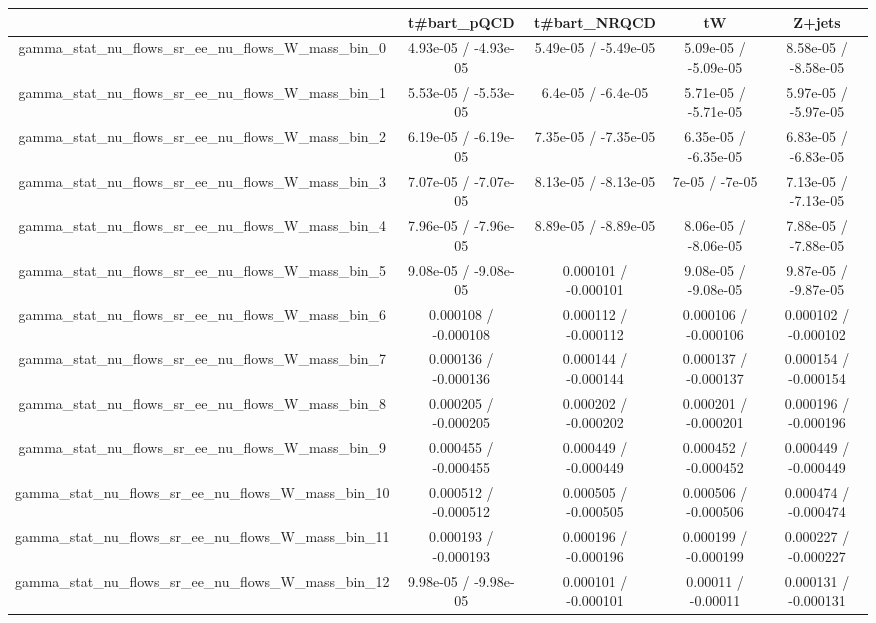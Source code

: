 \documentclass[10pt]{article}
\begin{document}
\begin{table}[htbp]
\begin{center}
\begin{tabular}{|c|c|c|c|c|}
\hline 
      & t#bar{t}_{pQCD}      & t#bar{t}_{NRQCD}      & tW      & Z+jets \\ 
\hline 
  gamma_stat_nu_flows_sr_ee_nu_flows_W_mass_bin_0 & 4.93e-05 / -4.93e-05 & 5.49e-05 / -5.49e-05 & 5.09e-05 / -5.09e-05 & 8.58e-05 / -8.58e-05 \\ 
  gamma_stat_nu_flows_sr_ee_nu_flows_W_mass_bin_1 & 5.53e-05 / -5.53e-05 & 6.4e-05 / -6.4e-05 & 5.71e-05 / -5.71e-05 & 5.97e-05 / -5.97e-05 \\ 
  gamma_stat_nu_flows_sr_ee_nu_flows_W_mass_bin_2 & 6.19e-05 / -6.19e-05 & 7.35e-05 / -7.35e-05 & 6.35e-05 / -6.35e-05 & 6.83e-05 / -6.83e-05 \\ 
  gamma_stat_nu_flows_sr_ee_nu_flows_W_mass_bin_3 & 7.07e-05 / -7.07e-05 & 8.13e-05 / -8.13e-05 & 7e-05 / -7e-05 & 7.13e-05 / -7.13e-05 \\ 
  gamma_stat_nu_flows_sr_ee_nu_flows_W_mass_bin_4 & 7.96e-05 / -7.96e-05 & 8.89e-05 / -8.89e-05 & 8.06e-05 / -8.06e-05 & 7.88e-05 / -7.88e-05 \\ 
  gamma_stat_nu_flows_sr_ee_nu_flows_W_mass_bin_5 & 9.08e-05 / -9.08e-05 & 0.000101 / -0.000101 & 9.08e-05 / -9.08e-05 & 9.87e-05 / -9.87e-05 \\ 
  gamma_stat_nu_flows_sr_ee_nu_flows_W_mass_bin_6 & 0.000108 / -0.000108 & 0.000112 / -0.000112 & 0.000106 / -0.000106 & 0.000102 / -0.000102 \\ 
  gamma_stat_nu_flows_sr_ee_nu_flows_W_mass_bin_7 & 0.000136 / -0.000136 & 0.000144 / -0.000144 & 0.000137 / -0.000137 & 0.000154 / -0.000154 \\ 
  gamma_stat_nu_flows_sr_ee_nu_flows_W_mass_bin_8 & 0.000205 / -0.000205 & 0.000202 / -0.000202 & 0.000201 / -0.000201 & 0.000196 / -0.000196 \\ 
  gamma_stat_nu_flows_sr_ee_nu_flows_W_mass_bin_9 & 0.000455 / -0.000455 & 0.000449 / -0.000449 & 0.000452 / -0.000452 & 0.000449 / -0.000449 \\ 
  gamma_stat_nu_flows_sr_ee_nu_flows_W_mass_bin_10 & 0.000512 / -0.000512 & 0.000505 / -0.000505 & 0.000506 / -0.000506 & 0.000474 / -0.000474 \\ 
  gamma_stat_nu_flows_sr_ee_nu_flows_W_mass_bin_11 & 0.000193 / -0.000193 & 0.000196 / -0.000196 & 0.000199 / -0.000199 & 0.000227 / -0.000227 \\ 
  gamma_stat_nu_flows_sr_ee_nu_flows_W_mass_bin_12 & 9.98e-05 / -9.98e-05 & 0.000101 / -0.000101 & 0.00011 / -0.00011 & 0.000131 / -0.000131 \\ 

\end{tabular}
\end{center}
\end{table}
\end{document}
